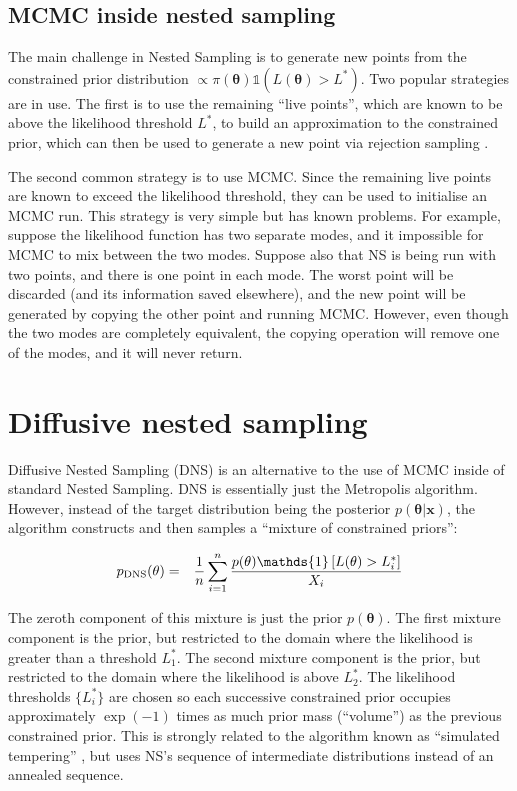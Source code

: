 \documentclass[
  ,final            %
  ]
  {aipproc}
\newcommand{\pars}{\boldsymbol{\theta}}
\newcommand{\data}{\mathbf{x}}
\begin{document}
\subsection{MCMC inside nested sampling}
The main challenge in Nested Sampling is to generate new points from the
constrained prior distribution $\propto \pi(\pars)\mathds{1}(L(\pars) > L^*)$.
Two popular strategies are in use. The first is to use the remaining ``live
points'', which are known to be above the likelihood threshold $L^*$, to build
an approximation to the constrained prior, which can then be used to generate
a new point via rejection sampling \citep{multinest}.

The second common strategy is to use MCMC. Since the remaining live points are
known to exceed the likelihood threshold, they can be used to initialise an
MCMC run. This strategy is very simple but has known problems. For example,
suppose the likelihood function has two separate modes, and it impossible for
MCMC to mix between the two modes. Suppose also that NS is being run with two
points, and there is one point in each mode. The worst point will be discarded
(and its information saved elsewhere), and the new point will be generated by
copying the other point and running MCMC. However, even though the two modes
are completely equivalent, the copying operation will remove one of the modes,
and it will never return.





\section{Diffusive nested sampling}
Diffusive Nested Sampling (DNS) is an alternative to the use of MCMC inside of
standard Nested Sampling. DNS is essentially just the Metropolis algorithm.
However, instead of the
target distribution being the posterior $p(\pars|\data)$, the algorithm
constructs and then samples a ``mixture of constrained priors'':

\begin{eqnarray}
p_{\rm DNS}(\theta) &=& \frac{1}{n}\sum_{i=1}^n
\frac{p(\theta)\mathds{1}\left[L(\theta) > L^*_i\right]}{X_i}
\end{eqnarray}

The zeroth component of this mixture is just the prior $p(\pars)$. The first
mixture component is the prior, but restricted to the domain where the
likelihood is greater than a threshold $L^*_1$. The second mixture component
is the prior, but restricted to the domain where the likelihood is above
$L^*_2$. The likelihood thresholds $\{ L^*_i \}$ are chosen so each
successive constrained prior occupies approximately $\exp(-1)$ times as much
prior mass (``volume'') as the previous constrained prior. This is strongly
related to the algorithm known as ``simulated tempering''
\citep{simulated_tempering}, but uses NS's
sequence of intermediate distributions instead of an annealed sequence.
\end{document}
